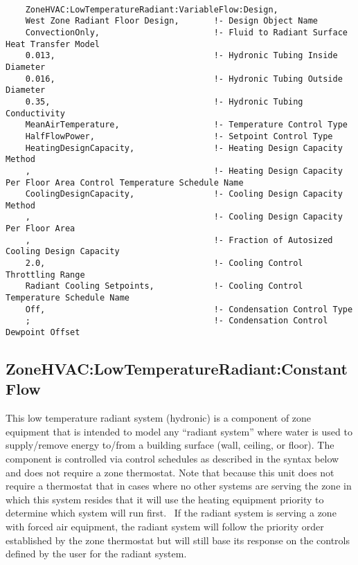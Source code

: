 \begin{lstlisting}
	
	ZoneHVAC:LowTemperatureRadiant:VariableFlow:Design,
	West Zone Radiant Floor Design,       !- Design Object Name
	ConvectionOnly,                       !- Fluid to Radiant Surface Heat Transfer Model
	0.013,                                !- Hydronic Tubing Inside Diameter
	0.016,                                !- Hydronic Tubing Outside Diameter
	0.35,                                 !- Hydronic Tubing Conductivity
	MeanAirTemperature,                   !- Temperature Control Type
	HalfFlowPower,                        !- Setpoint Control Type
	HeatingDesignCapacity,                !- Heating Design Capacity Method
	,                                     !- Heating Design Capacity Per Floor Area Control Temperature Schedule Name
	CoolingDesignCapacity,                !- Cooling Design Capacity Method
	,                                     !- Cooling Design Capacity Per Floor Area
	,                                     !- Fraction of Autosized Cooling Design Capacity
	2.0,                                  !- Cooling Control Throttling Range
	Radiant Cooling Setpoints,            !- Cooling Control Temperature Schedule Name
	Off,                                  !- Condensation Control Type
	;                                     !- Condensation Control Dewpoint Offset
\end{lstlisting}


\subsection{ZoneHVAC:LowTemperatureRadiant:ConstantFlow}\label{zonehvaclowtemperatureradiantconstantflow}

This low temperature radiant system (hydronic) is a component of zone equipment that is intended to model any ``radiant system'' where water is used to supply/remove energy to/from a building surface (wall, ceiling, or floor). The component is controlled via control schedules as described in the syntax below and does not require a zone thermostat. Note that because this unit does not require a thermostat that in cases where no other systems are serving the zone in which this system resides that it will use the heating equipment priority to determine which system will run first.~ If the radiant system is serving a zone with forced air equipment, the radiant system will follow the priority order established by the zone thermostat but will still base its response on the controls defined by the user for the radiant system.

